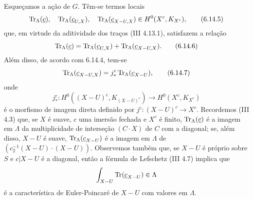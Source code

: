 Esqueçamos a ação de $G$. Têm-se termos locais
\begin{equation}
\operatorname{Tr}_{\Lambda}(\underline c),\quad
\operatorname{Tr}_{\Lambda}(\underline c_{U,X}),\quad
\operatorname{Tr}_{\Lambda}(\underline c_{X-U,X})
\in H^0(X^c,K_{X^c}),
\tag{6.14.5}
\end{equation}
que, em virtude da aditividade dos traços (III 4.13.1), satisfazem a relação
\begin{equation}
\operatorname{Tr}_{\Lambda}(\underline c)
=
\operatorname{Tr}_{\Lambda}(\underline c_{U,X})
+
\operatorname{Tr}_{\Lambda}(\underline c_{X-U,X}).
\tag{6.14.6}
\end{equation}
Além disso, de acordo com 6.14.4, tem-se
\begin{equation}
\operatorname{Tr}_{\Lambda}(\underline c_{X-U,X})
=
j_*^c\operatorname{Tr}_{\Lambda}(\underline c_{X-U}),
\tag{6.14.7}
\end{equation}
onde
\[
j_*^c:H^0((X-U)^c,K_{(X-U)^c})\longrightarrow H^0(X^c,K_{X^c})
\]
é o morfismo de imagem direta definido por $j^c:(X-U)^c\to X^c$. Recordemos (III 4.3) que, se $X$ é suave, $c$ uma imersão fechada e $X^c$ é finito, $\operatorname{Tr}_{\Lambda}(\underline c)$ é a imagem em $\Lambda$ da multiplicidade de interseção $(C\cdot X)$ de $C$ com a diagonal; se, além disso, $X-U$ é suave, $\operatorname{Tr}_{\Lambda}(\underline c_{X-U})$ é a imagem em $\Lambda$ de $(c_2^{-1}(X-U)\cdot(X-U))$. Observemos também que, se $X-U$ é próprio sobre $S$ e $c|X-U$ é a diagonal, então a fórmula de Lefschetz (III 4.7) implica que
\[
\int_{X-U}\operatorname{Tr}(\underline c_{X-U})\in\Lambda
\]
é a característica de Euler-Poincaré de $X-U$ com valores em $\Lambda$.
